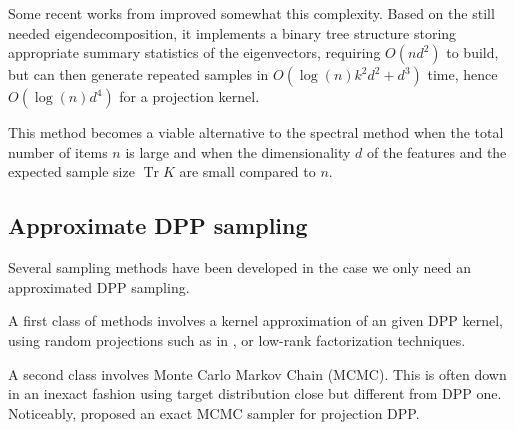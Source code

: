Some recent works from \cite{gillenwater2019_treebased_fast_dpp_sampling} improved somewhat this complexity. Based on the still needed eigendecomposition, it implements a binary tree structure storing appropriate summary statistics of the eigenvectors, requiring $O(n d^2)$ to build, but can then generate repeated
samples in $O(\log(n)k^2d^2 + d^3)$ time, hence $O(\log(n)d^4)$ for a projection kernel.

This method becomes a viable alternative to the spectral method when the total
number of items $n$ is large and when the dimensionality $d$ of the
features and the expected sample size $\operatorname{Tr} K$ are small compared to $n$.





\subsection{Approximate DPP sampling}
Several sampling methods have been developed in the case we only need an approximated DPP sampling.

A first class of methods involves a kernel approximation of an given DPP kernel, using random projections such as in \cite{kulesza2012_dpp_for_ml}, or low-rank factorization techniques.

A second class involves Monte Carlo Markov Chain (MCMC). This is often down in an inexact fashion using target distribution close but different from DPP one. Noticeably, \cite{gautier2017_zonotope_for_dpp_sampling} proposed an exact MCMC
sampler for projection DPP.

\vspace{10cm}
